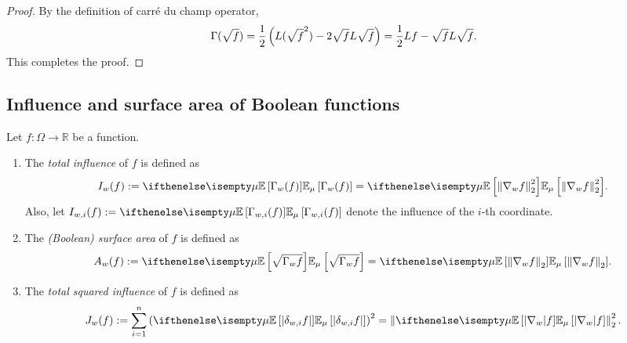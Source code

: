 
\begin{proof}
    By the definition of carr\'e du champ operator, 
    \begin{align*}
        \Gamma(\sqrt{f}) = \frac{1}{2} \left(L(\sqrt{f}^2) - 2\sqrt{f} L \sqrt{f}\right) = \frac{1}{2} Lf - \sqrt{f} L \sqrt{f}.
    \end{align*}
    This completes the proof.
\end{proof}










\subsection{Influence and surface area of Boolean functions}

\begin{definition}
    Let $f: \Omega \to \mathbb{R}$ be a function.

    \begin{enumerate}[(1)]
        \item The \textit{total influence} of $f$ is defined as
        \begin{align*}
            I_w(f) := \E[\mu]{\Gamma_{w}(f)} = \E[\mu]{\norm{\nabla_w f}^2_2}.
        \end{align*}
        Also, let $I_{w,i}(f) := \E[\mu]{\Gamma_{w,i}(f)}$ denote the influence of the $i$-th coordinate.

        \item The \textit{(Boolean) surface area} of $f$ is defined as
        \begin{align*}
            A_w(f) := \E[\mu]{\sqrt{\Gamma_wf}} = \E[\mu]{\norm{\nabla_w f}_2}.
        \end{align*}

        \item The \textit{total squared influence} of $f$ is defined as
        \begin{align*}
            J_{w}(f) := \sum_{i=1}^n \tp{\E[\mu]{\abs{\delta_{w,i} f}}}^2 = \norm{\E[\mu]{|\nabla_w| f}}^2_2.
        \end{align*}
    \end{enumerate}
    
\end{definition}



